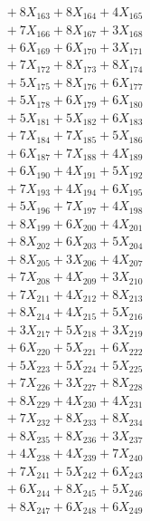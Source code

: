 \documentclass[a4paper,10pt]{article}
\begin{document}
{\begin{align}
&\;  + 8 X_{163} + 8 X_{164} + 4 X_{165} \\[0.3ex]
&\;  + 7 X_{166} + 8 X_{167} + 3 X_{168} \\[0.3ex]
&\;  + 6 X_{169} + 6 X_{170} + 3 X_{171} \\[0.3ex]
&\;  + 7 X_{172} + 8 X_{173} + 8 X_{174} \\[0.3ex]
&\;  + 5 X_{175} + 8 X_{176} + 6 X_{177} \\[0.3ex]
&\;  + 5 X_{178} + 6 X_{179} + 6 X_{180} \\[0.3ex]
&\;  + 5 X_{181} + 5 X_{182} + 6 X_{183} \\[0.3ex]
&\;  + 7 X_{184} + 7 X_{185} + 5 X_{186} \\[0.3ex]
&\;  + 6 X_{187} + 7 X_{188} + 4 X_{189} \\[0.5ex]\allowbreak
&\;  + 6 X_{190} + 4 X_{191} + 5 X_{192} \\[0.3ex]
&\;  + 7 X_{193} + 4 X_{194} + 6 X_{195} \\[0.3ex]
&\;  + 5 X_{196} + 7 X_{197} + 4 X_{198} \\[0.3ex]
&\;  + 8 X_{199} + 6 X_{200} + 4 X_{201} \\[0.3ex]
&\;  + 8 X_{202} + 6 X_{203} + 5 X_{204} \\[0.3ex]
&\;  + 8 X_{205} + 3 X_{206} + 4 X_{207} \\[0.3ex]
&\;  + 7 X_{208} + 4 X_{209} + 3 X_{210} \\[0.3ex]
&\;  + 7 X_{211} + 4 X_{212} + 8 X_{213} \\[0.3ex]
&\;  + 8 X_{214} + 4 X_{215} + 5 X_{216} \\[0.3ex]
&\;  + 3 X_{217} + 5 X_{218} + 3 X_{219} \\[0.5ex]\allowbreak
&\;  + 6 X_{220} + 5 X_{221} + 6 X_{222} \\[0.3ex]
&\;  + 5 X_{223} + 5 X_{224} + 5 X_{225} \\[0.3ex]
&\;  + 7 X_{226} + 3 X_{227} + 8 X_{228} \\[0.3ex]
&\;  + 8 X_{229} + 4 X_{230} + 4 X_{231} \\[0.3ex]
&\;  + 7 X_{232} + 8 X_{233} + 8 X_{234} \\[0.3ex]
&\;  + 8 X_{235} + 8 X_{236} + 3 X_{237} \\[0.3ex]
&\;  + 4 X_{238} + 4 X_{239} + 7 X_{240} \\[0.3ex]
&\;  + 7 X_{241} + 5 X_{242} + 6 X_{243} \\[0.3ex]
&\;  + 6 X_{244} + 8 X_{245} + 5 X_{246} \\[0.3ex]
&\;  + 8 X_{247} + 6 X_{248} + 6 X_{249} \\[0.5ex]\allowbreak

\end{align}}
\end{document}
